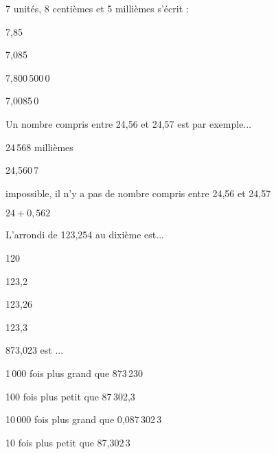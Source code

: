  \begin{QCM}
  \begin{GroupeQCM} 
       \begin{exercice}
      7 unités, 8 centièmes et 5 millièmes s'écrit :
      \begin{ChoixQCM}{4}
      \item 7,85
      \item 7,085
      \item 7,800\,500\,0
      \item 7,0085\,0
      \end{ChoixQCM}
      \begin{corrige}
   \end{corrige}
    \end{exercice}


     \begin{exercice}
      Un nombre compris entre 24,56 et 24,57 est par exemple...
      \begin{ChoixQCM}{4}
      \item 24\,568 millièmes
      \item 24,560\,7
      \item impossible, il n'y a pas de nombre compris entre 24,56 et 24,57
      \item $24 + 0,562$
      \end{ChoixQCM}
      \begin{corrige}
   \end{corrige}
    \end{exercice}
    
     \begin{exercice}
      L'arrondi de 123,254 au dixième est...
      \begin{ChoixQCM}{4}
      \item 120
      \item 123,2
      \item 123,26
      \item 123,3
      \end{ChoixQCM}
      \begin{corrige}
   \end{corrige}
    \end{exercice}

     \begin{exercice}
      873,023 est ...
      \begin{ChoixQCM}{4}
      \item 1\,000 fois plus grand que 873\,230
      \item 100 fois plus petit que 87\,302,3
      \item 10\,000 fois plus grand que 0,087\,302\,3
      \item 10 fois plus petit que 87,302\,3
      \end{ChoixQCM}
      \begin{corrige}
   \end{corrige}
    \end{exercice}
    

\end{GroupeQCM}
\end{QCM}
